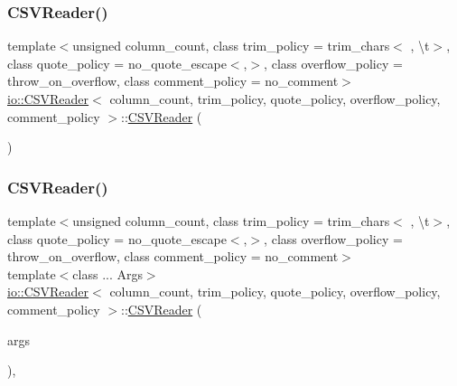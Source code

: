 \subsubsection{\texorpdfstring{C\+S\+V\+Reader()}{CSVReader()}\hspace{0.1cm}{\footnotesize\ttfamily [2/3]}}
{\footnotesize\ttfamily template$<$unsigned column\+\_\+count, class trim\+\_\+policy  = trim\+\_\+chars$<$\textquotesingle{} \textquotesingle{}, \textquotesingle{}\textbackslash{}t\textquotesingle{}$>$, class quote\+\_\+policy  = no\+\_\+quote\+\_\+escape$<$\textquotesingle{},\textquotesingle{}$>$, class overflow\+\_\+policy  = throw\+\_\+on\+\_\+overflow, class comment\+\_\+policy  = no\+\_\+comment$>$ \\
\hyperlink{classio_1_1CSVReader}{io\+::\+C\+S\+V\+Reader}$<$ column\+\_\+count, trim\+\_\+policy, quote\+\_\+policy, overflow\+\_\+policy, comment\+\_\+policy $>$\+::\hyperlink{classio_1_1CSVReader}{C\+S\+V\+Reader} (\begin{DoxyParamCaption}\item[{const \hyperlink{classio_1_1CSVReader}{C\+S\+V\+Reader}$<$ column\+\_\+count, trim\+\_\+policy, quote\+\_\+policy, overflow\+\_\+policy, comment\+\_\+policy $>$ \&}]{ }\end{DoxyParamCaption})\hspace{0.3cm}{\ttfamily [delete]}}

\mbox{\label{classio_1_1CSVReader_a189debf95672e7cd7582e9f73d7203e5}} 
\subsubsection{\texorpdfstring{C\+S\+V\+Reader()}{CSVReader()}\hspace{0.1cm}{\footnotesize\ttfamily [3/3]}}
{\footnotesize\ttfamily template$<$unsigned column\+\_\+count, class trim\+\_\+policy  = trim\+\_\+chars$<$\textquotesingle{} \textquotesingle{}, \textquotesingle{}\textbackslash{}t\textquotesingle{}$>$, class quote\+\_\+policy  = no\+\_\+quote\+\_\+escape$<$\textquotesingle{},\textquotesingle{}$>$, class overflow\+\_\+policy  = throw\+\_\+on\+\_\+overflow, class comment\+\_\+policy  = no\+\_\+comment$>$ \\
template$<$class ... Args$>$ \\
\hyperlink{classio_1_1CSVReader}{io\+::\+C\+S\+V\+Reader}$<$ column\+\_\+count, trim\+\_\+policy, quote\+\_\+policy, overflow\+\_\+policy, comment\+\_\+policy $>$\+::\hyperlink{classio_1_1CSVReader}{C\+S\+V\+Reader} (\begin{DoxyParamCaption}\item[{Args \&\&...}]{args }\end{DoxyParamCaption})\hspace{0.3cm}{\ttfamily [inline]}, {\ttfamily [explicit]}}



